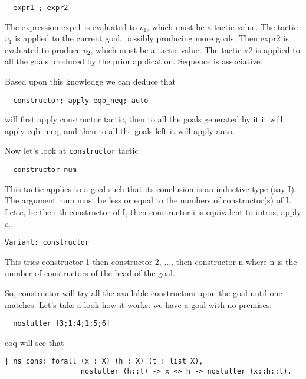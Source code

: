 \documentclass[12pt]{article}
\begin{document}
\begin{verbatim}
  expr1 ; expr2
\end{verbatim}

The expression expr1 is evaluated to $v_1$, which must be a tactic value. The tactic $v_1$ is applied to the
current goal, possibly producing more goals. Then expr2 is evaluated to produce $v_2$, which must be a
tactic value. The tactic v2 is applied to all the goals produced by the prior application. Sequence is
associative.

Based upon this knowledge we can deduce that

\begin{verbatim}
  constructor; apply eqb_neq; auto
\end{verbatim}

will first apply constructor tactic, then to all the goals generated by it it will apply eqb\_neq, and then to all the goals left it will apply auto.

Now let's look at {\tt constructor} tactic

\begin{verbatim}
  constructor num
\end{verbatim}

This tactic applies to a goal such that its conclusion is an inductive type (say I). The argument num
must be less or equal to the numbers of constructor(s) of I. Let $c_i$ be the i-th constructor of I, then
constructor i is equivalent to intros; apply $c_i$.

\begin{verbatim}
Variant: constructor
\end{verbatim}

This tries constructor 1 then constructor 2, ..., then constructor n where n is the number
of constructors of the head of the goal.

So, constructor will try all the available constructors upon the goal until one matches. Let's take a look how it works: we have a goal with no premises:

\begin{verbatim}
  nostutter [3;1;4;1;5;6]
\end{verbatim}

coq will see that

\begin{verbatim}
| ns_cons: forall (x : X) (h : X) (t : list X),
                  nostutter (h::t) -> x <> h -> nostutter (x::h::t).
\end{verbatim}
\end{document}
